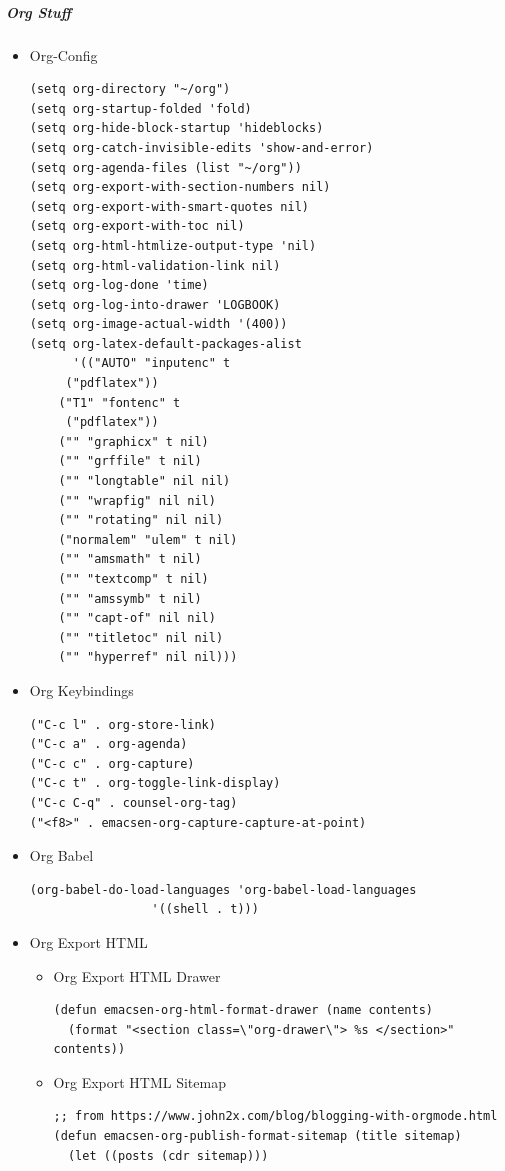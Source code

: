 \documentclass[11pt]{article}
\begin{document}
\subparagraph*{Org Stuff}
\label{sec:org3dd50b6}
\begin{itemize}
\item Org-Config
\label{sec:org2bd6023}
\begin{verbatim}
(setq org-directory "~/org")
(setq org-startup-folded 'fold)
(setq org-hide-block-startup 'hideblocks)
(setq org-catch-invisible-edits 'show-and-error)
(setq org-agenda-files (list "~/org"))
(setq org-export-with-section-numbers nil)
(setq org-export-with-smart-quotes nil)
(setq org-export-with-toc nil)
(setq org-html-htmlize-output-type 'nil)
(setq org-html-validation-link nil)
(setq org-log-done 'time)
(setq org-log-into-drawer 'LOGBOOK)
(setq org-image-actual-width '(400))
(setq org-latex-default-packages-alist
      '(("AUTO" "inputenc" t
	 ("pdflatex"))
	("T1" "fontenc" t
	 ("pdflatex"))
	("" "graphicx" t nil)
	("" "grffile" t nil)
	("" "longtable" nil nil)
	("" "wrapfig" nil nil)
	("" "rotating" nil nil)
	("normalem" "ulem" t nil)
	("" "amsmath" t nil)
	("" "textcomp" t nil)
	("" "amssymb" t nil)
	("" "capt-of" nil nil)
	("" "titletoc" nil nil)
	("" "hyperref" nil nil)))
\end{verbatim}
\item Org Keybindings
\label{sec:orgda5ecc8}
\begin{verbatim}
("C-c l" . org-store-link)
("C-c a" . org-agenda)
("C-c c" . org-capture)
("C-c t" . org-toggle-link-display)
("C-c C-q" . counsel-org-tag)
("<f8>" . emacsen-org-capture-capture-at-point)
\end{verbatim}
\item Org Babel
\label{sec:org7901672}
\begin{verbatim}
(org-babel-do-load-languages 'org-babel-load-languages
			     '((shell . t)))
\end{verbatim}
\item Org Export HTML
\label{sec:org5182399}
\begin{itemize}
\item Org Export HTML Drawer
\label{sec:org4e410e4}
\begin{verbatim}
(defun emacsen-org-html-format-drawer (name contents)
  (format "<section class=\"org-drawer\"> %s </section>" contents))
\end{verbatim}
\item Org Export HTML Sitemap
\label{sec:org7d62895}
\begin{verbatim}
;; from https://www.john2x.com/blog/blogging-with-orgmode.html
(defun emacsen-org-publish-format-sitemap (title sitemap)
  (let ((posts (cdr sitemap)))

\end{verbatim}
\end{itemize}
\end{itemize}
\end{document}
